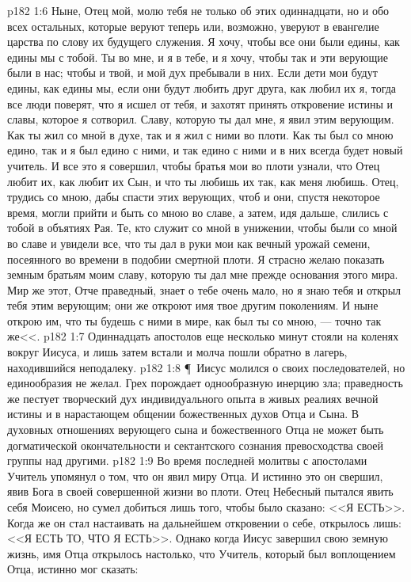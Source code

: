 \vs p182 1:6 Ныне, Отец мой, молю тебя не только об этих одиннадцати, но и обо всех остальных, которые веруют теперь или, возможно, уверуют в евангелие царства по слову их будущего служения. Я хочу, чтобы все они были едины, как едины мы с тобой. Ты во мне, и я в тебе, и я хочу, чтобы так и эти верующие были в нас; чтобы и твой, и мой дух пребывали в них. Если дети мои будут едины, как едины мы, если они будут любить друг друга, как любил их я, тогда все люди поверят, что я исшел от тебя, и захотят принять откровение истины и славы, которое я сотворил. Славу, которую ты дал мне, я явил этим верующим. Как ты жил со мной в духе, так и я жил с ними во плоти. Как ты был со мною едино, так и я был едино с ними, и так едино с ними и в них всегда будет новый учитель. И все это я совершил, чтобы братья мои во плоти узнали, что Отец любит их, как любит их Сын, и что ты любишь их так, как меня любишь. Отец, трудись со мною, дабы спасти этих верующих, чтоб и они, спустя некоторое время, могли прийти и быть со мною во славе, а затем, идя дальше, слились с тобой в объятиях Рая. Те, кто служит со мной в унижении, чтобы были со мной во славе и увидели все, что ты дал в руки мои как вечный урожай семени, посеянного во времени в подобии смертной плоти. Я страсно желаю показать земным братьям моим славу, которую ты дал мне прежде основания этого мира. Мир же этот, Отче праведный, знает о тебе очень мало, но я знаю тебя и открыл тебя этим верующим; они же откроют имя твое другим поколениям. И ныне открою им, что ты будешь с ними в мире, как был ты со мною, --- точно так же<<.
\vs p182 1:7 Одиннадцать апостолов еще несколько минут стояли на коленях вокруг Иисуса, и лишь затем встали и молча пошли обратно в лагерь, находившийся неподалеку.
\vs p182 1:8 \P\ Иисус молился о  своих последователей, но единообразия не желал. Грех порождает однообразную инерцию зла; праведность же пестует творческий дух индивидуального опыта в живых реалиях вечной истины и в нарастающем общении божественных духов Отца и Сына. В духовных отношениях верующего сына и божественного Отца не может быть догматической окончательности и сектантского сознания превосходства своей группы над другими.
\vs p182 1:9 Во время последней молитвы с апостолами Учитель упомянул о том, что он явил миру  Отца. И истинно это он свершил, явив Бога в своей совершенной жизни во плоти. Отец Небесный пытался явить себя Моисею, но сумел добиться лишь того, чтобы было сказано: <<Я ЕСТЬ>>. Когда же он стал настаивать на дальнейшем откровении о себе, открылось лишь: <<Я ЕСТЬ ТО, ЧТО Я ЕСТЬ>>. Однако когда Иисус завершил свою земную жизнь, имя Отца открылось настолько, что Учитель, который был воплощением Отца, истинно мог сказать:
